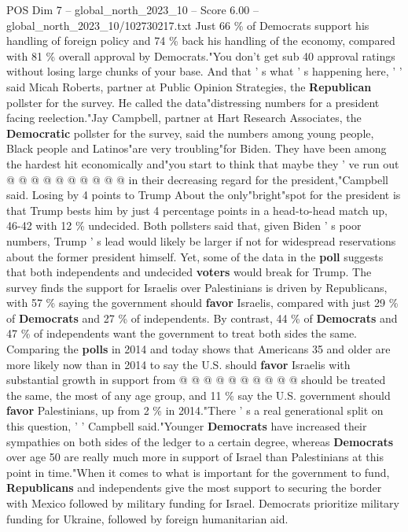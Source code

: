 \begin{textsample}{POS Dim 7 – global\_north\_2023\_10 – Score 6.00 – global\_north\_2023\_10/102730217.txt}
Just 66 \% of Democrats support his handling of foreign policy and 74 \% back his handling of the economy, compared with 81 \% overall approval by Democrats."You don't get sub 40 approval ratings without losing large chunks of your base.
And that ' s what ' s happening here, ' ' said Micah Roberts, partner at Public Opinion Strategies, the \textbf{Republican} pollster for the survey.
He called the data"distressing numbers for a president facing reelection."Jay Campbell, partner at Hart Research Associates, the \textbf{Democratic} pollster for the survey, said the numbers among young people, Black people and Latinos"are very troubling"for Biden.
They have been among the hardest hit economically and"you start to think that maybe they ' ve run out @ @ @ @ @ @ @ @ @ @ in their decreasing regard for the president,"Campbell said.
Losing by 4 points to Trump About the only"bright"spot for the president is that Trump bests him by just 4 percentage points in a head-to-head match up, 46-42 with 12 \% undecided.
Both pollsters said that, given Biden ' s poor numbers, Trump ' s lead would likely be larger if not for widespread reservations about the former president himself.
Yet, some of the data in the \textbf{poll} suggests that both independents and undecided \textbf{voters} would break for Trump.
The survey finds the support for Israelis over Palestinians is driven by Republicans, with 57 \% saying the government should \textbf{favor} Israelis, compared with just 29 \% of \textbf{Democrats} and 27 \% of independents.
By contrast, 44 \% of \textbf{Democrats} and 47 \% of independents want the government to treat both sides the same.
Comparing the \textbf{polls} in 2014 and today shows that Americans 35 and older are more likely now than in 2014 to say the U.S. should \textbf{favor} Israelis with substantial growth in support from @ @ @ @ @ @ @ @ @ @ should be treated the same, the most of any age group, and 11 \% say the U.S. government should \textbf{favor} Palestinians, up from 2 \% in 2014."There ' s a real generational split on this question, ' ' Campbell said."Younger \textbf{Democrats} have increased their sympathies on both sides of the ledger to a certain degree, whereas \textbf{Democrats} over age 50 are really much more in support of Israel than Palestinians at this point in time."When it comes to what is important for the government to fund, \textbf{Republicans} and independents give the most support to securing the border with Mexico followed by military funding for Israel.
Democrats prioritize military funding for Ukraine, followed by foreign humanitarian aid.

\end{textsample}
